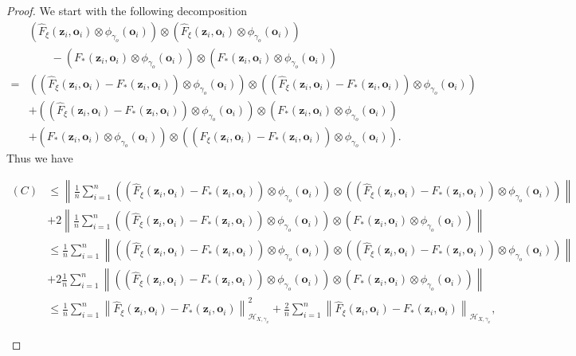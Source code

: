 \documentclass[11pt]{article}
\newcommand{\bz}{\mathbf z}
\newcommand{\bo}{\mathbf o}
\newcommand{\calH}{\mathcal{H}}
\newcommand{\0}{\mathbf{0}}
\begin{document}
\begin{appendix}
\begin{proof}
We start with the following decomposition
\begin{align*}
    &\left(\hat{F}_\xi(\bz_i,\bo_i)\otimes \phi_{\gamma_o}(\bo_i)\right)\otimes\left(\hat{F}_\xi(\bz_i,\bo_i)\otimes \phi_{\gamma_o}(\bo_i)\right) \\
    & \quad\quad - \left(F_{\ast}(\bz_i,\bo_i)\otimes\phi_{\gamma_o}(\bo_i)\right) \otimes \left(F_{\ast}(\bz_i,\bo_i)\otimes\phi_{\gamma_o}(\bo_i)\right) \\
    =&\left(\left(\hat{F}_\xi(\bz_i,\bo_i) - F_{\ast}(\bz_i,\bo_i) \right) \otimes\phi_{\gamma_o}(\bo_i)\right) \otimes \left(\left(\hat{F}_\xi(\bz_i,\bo_i) - F_{\ast}(\bz_i,\bo_i) \right)\otimes\phi_{\gamma_o}(\bo_i)\right) \\ &+ \left(\left(\hat{F}_\xi(\bz_i,\bo_i) - F_{\ast}(\bz_i,\bo_i) \right)\otimes \phi_{\gamma_o}(\bo_i)\right)\otimes (F_{\ast}(\bz_i,\bo_i)\otimes \phi_{\gamma_o}(\bo_i)) \\
    &+ (F_{\ast}(\bz_i,\bo_i)\otimes \phi_{\gamma_o}(\bo_i)) \otimes \left(\left(\hat{F}_\xi(\bz_i,\bo_i) - F_{\ast}(\bz_i,\bo_i) \right)\otimes \phi_{\gamma_o}(\bo_i)\right).
\end{align*}
Thus we have
\begin{small}
\begin{align*}
    (C)&\leq \left\|\frac{1}{n}\sum_{i=1}^{n}\left(\left(\hat{F}_\xi(\bz_i,\bo_i) - F_{\ast}(\bz_i,\bo_i) \right)\otimes\phi_{\gamma_o}(\bo_i)\right) \otimes \left(\left(\hat{F}_\xi(\bz_i,\bo_i) - F_{\ast}(\bz_i,\bo_i) \right)\otimes\phi_{\gamma_o}(\bo_i)\right) \right\| \nonumber \\
    &+ 2\left\|\frac{1}{n}\sum_{i=1}^{n}\left(\left(\hat{F}_\xi(\bz_i,\bo_i) - F_{\ast}(\bz_i,\bo_i) \right)\otimes \phi_{\gamma_o}(\bo_i)\right)\otimes (F_{\ast}(\bz_i,\bo_i)\otimes \phi_{\gamma_o}(\bo_i))\right\|\nonumber\\
    &\leq \frac{1}{n}\sum_{i=1}^{n} \left\| \left(\left(\hat{F}_\xi(\bz_i,\bo_i) - F_{\ast}(\bz_i,\bo_i) \right)\otimes \phi_{\gamma_o}(\bo_i)\right) \otimes \left(\left(\hat{F}_\xi(\bz_i,\bo_i) - F_{\ast}(\bz_i,\bo_i) \right)\otimes\phi_{\gamma_o}(\bo_i)\right) \right\| \nonumber \\
    &+ 2\frac{1}{n}\sum_{i=1}^{n} \left\|\left(\left(\hat{F}_\xi(\bz_i,\bo_i) - F_{\ast}(\bz_i,\bo_i) \right)\otimes \phi_{\gamma_o}(\bo_i)\right)\otimes (F_{\ast}(\bz_i,\bo_i)\otimes \phi_{\gamma_o}(\bo_i))\right\|\nonumber  \\
    &\leq \frac{1}{n}\sum_{i=1}^{n}\left\|\hat{F}_\xi (\bz_i,\bo_i) -F_{\ast}(\bz_i,\bo_i) \right\|_{\calH_{X,\gamma_x}}^2  + \frac{2}{n}\sum_{i=1}^{n}\left\|\hat{F}_\xi (\bz_i,\bo_i) -F_{\ast}(\bz_i,\bo_i)\right\|_{\calH_{X,\gamma_x}},

\end{align*}
\end{small}
\end{proof}
\end{appendix}
\end{document}
